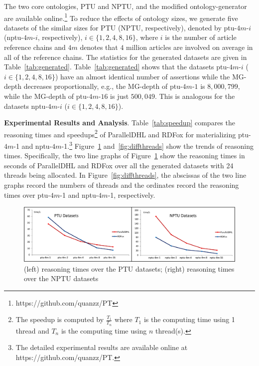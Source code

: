 The two core ontologies, PTU and NPTU,
and the modified ontology-generator are available online.\footnote{https://github.com/quanzz/PT}
To reduce the effects of ontology sizes, we generate five datasets of
the similar sizes for PTU (NPTU, respectively), denoted by
ptu-$4m$-$i$ (nptu-$4m$-$i$, respectively), $i\in\{1,2,4,8,16\}$,
where $i$ is the number of article reference chains
and $4m$ denotes that $4$ million articles are involved on average in all of the reference chains.
The statistics for the generated datasets are given in Table~\ref{tab:generated}.
Table~\ref{tab:generated} shows that the datasets ptu-$4m$-$i$ ($i\in\{1,2,4,8,16\}$)
have an almost identical number of assertions while the MG-depth
decreases proportionally, e.g., the MG-depth of ptu-$4m$-$1$ is
$8,000,799$, while the MG-depth of ptu-$4m$-$16$ is just
$500,049$. This is
analogous for the datasets nptu-$4m$-$i$ ($i\in\{1,2,4,8,16\}$).


\textbf{Experimental Results and Analysis}.
Table~\ref{tab:speedup} compares the reasoning times and
speedups\footnote{The speedup is computed by $\frac{T_1}{T_n}$ where $T_1$ is the computing time
using 1 thread and $T_n$ is the computing time using $n$ thread(s).}
of ParallelDHL and RDFox for materializing ptu-$4m$-1 and
nptu-$4m$-1.\footnote{The detailed experimental results are available
  online at https://github.com/quanzz/PT.}
Figure~\ref{fig:diffdepths} and~\ref{fig:diffthreads} show the trends of
reasoning times. Specifically, the two line graphs of Figure~\ref{fig:diffdepths}
show the reasoning times in seconds of ParallelDHL and RDFox over
all the generated datasets with 24 threads being allocated. In Figure~\ref{fig:diffthreads},
the abscissas of the two line graphs record the numbers of threads and
the ordinates record the reasoning times over ptu-$4m$-1 and nptu-$4m$-1, respectively.

\begin{figure}[htbp]
\begin{center}
\includegraphics[width=1\textwidth]{fig-diff-depths.eps}
\caption{(left) reasoning times over the PTU datasets; (right)
  reasoning times over the NPTU datasets}
\label{fig:diffdepths}
\end{center}
\end{figure}

